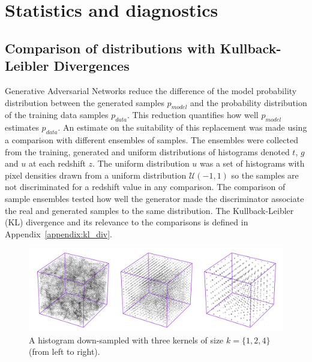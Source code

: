 \documentclass[twocolumn]{article}
\numberwithin{equation}{section}
\begin{document}

\section{Statistics and diagnostics}\label{sec:stats_and_diags}

\subsection{Comparison of distributions with Kullback-Leibler Divergences}
Generative Adversarial Networks reduce the difference of the model probability distribution between the generated samples 
$p_{model}$ and the probability distribution of the training data samples $p_{data}$. This reduction quantifies how well 
$p_{model}$ estimates $p_{data}$. An estimate on the suitability of this replacement was made using a comparison with 
different ensembles of samples. The ensembles were collected from the training, generated and uniform distributions of 
histograms denoted $t$, $g$ and $u$ at each redshift $z$. The uniform distribution $u$ was a set of histograms with pixel 
densities drawn from a uniform distribution $\mathcal{U}(-1,1)$ so the samples are not discriminated for a redshift value 
in any comparison. The comparison of sample ensembles tested how well the generator made the discriminator associate the 
real and generated samples to the same distribution. The Kullback-Leibler (KL) divergence and its relevance to the 
comparisons is defined in Appendix~\ref{appendix:kl_div}.

\begin{figure}[!ht]%
\includegraphics[width=\columnwidth]{figures/diagrams/kernel_fig.png}
\centering
\caption{A histogram down-sampled with three kernels of size $k=\{1, 2, 4\}$ (from left to right).}
\label{fig:kernel_fig}
\end{figure}
\end{document}
